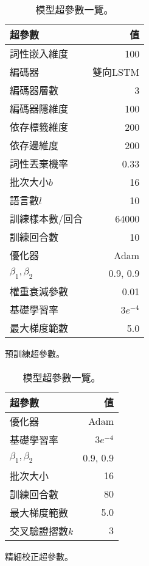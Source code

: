 \begin{table}[htbp]
    \centering
    \begin{subtable}[t]{.4\textwidth}
        \begin{tabular}[t]{@{}lr@{}}
        \toprule
        超參數 & 值 \\
        \midrule
            詞性嵌入維度         & 100 \\
            編碼器              & 雙向LSTM \\
            編碼器層數           & 3 \\
            編碼器隱維度         & 100 \\
            依存標籤維度         & 200 \\
            依存邊維度           & 200 \\
            詞性丟棄機率            & 0.33 \\
            批次大小$b$         & 16 \\
            語言數$l$           & 10 \\
            訓練樣本數/回合        & 64000 \\
            訓練回合數          & 10 \\
            優化器              & Adam \\
            $\beta_1,\beta_2$  & 0.9, 0.9 \\
            權重衰減參數         & 0.01 \\
            基礎學習率          & $3e^{-4}$ \\
            最大梯度範數        & 5.0 \\
        \bottomrule
        \end{tabular}
        \caption{
            預訓練超參數。
        }
        \label{tab:delex_pretrain_hparams}
    \end{subtable}
    \begin{subtable}[t]{.4\textwidth}
        \begin{tabular}[t]{@{}lr@{}}
        \toprule
        超參數 & 值 \\
        \midrule
            優化器              & Adam \\
            基礎學習率          & $3e^{-4}$ \\
            $\beta_1,\beta_2$  & 0.9, 0.9 \\
            批次大小            & 16 \\
            訓練回合數          & 80 \\
            最大梯度範數        & 5.0 \\
            交叉驗證摺數$k$     & 3   \\
        \bottomrule
        \end{tabular}
        \caption{
            精細校正超參數。
        }
        \label{tab:delex_finetune_hparams}
    \end{subtable}
    \caption{
        模型超參數一覽。
    }
    \label{tab:delex_hparams}
\end{table}
